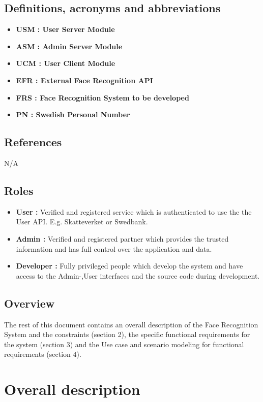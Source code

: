\documentclass[a4paper,11pt]{article}
\begin{document}
 
\subsection{Definitions, acronyms and abbreviations}
\begin{itemize}
\item \textbf{USM : User Server Module}
\item \textbf{ASM : Admin Server Module}
\item \textbf{UCM : User Client Module}
\item \textbf{EFR : External Face Recognition API}
\item \textbf{FRS : Face Recognition System to be developed}
\item \textbf{PN : Swedish Personal Number}
\end{itemize}

\subsection{References}
N/A
\subsection{Roles} \label{Roles}
\begin{itemize}
\item \textbf{User :} Verified and registered service which is authenticated to use the the User API. E.g. Skatteverket or Swedbank.
\item \textbf{Admin :} Verified and registered partner which provides the trusted information and has full control over the application and data.
\item \textbf{Developer :} Fully privileged people which develop the system and have access to the Admin-,User interfaces and the source code during development. 
\end{itemize}

\subsection{Overview}
The rest of this document contains an overall description of the Face Recognition System and the constraints (section 2), the specific functional requirements for the system (section 3) and the Use case and scenario modeling for functional requirements (section 4).

\newpage
\section{Overall description}
\end{document}
